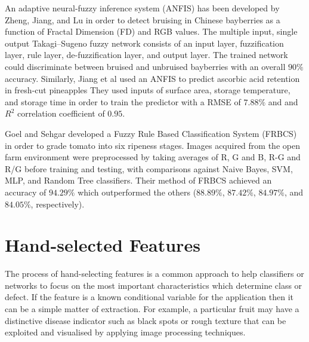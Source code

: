 \documentclass[fleqn,twoside,12pt]{report}
\begin{document}
An adaptive neural-fuzzy inference system (ANFIS) has been developed by Zheng, Jiang, and Lu \cite{zheng} in order to detect bruising in Chinese bayberries as a function of Fractal Dimension (FD) and RGB values. The multiple input, single output Takagi–Sugeno fuzzy network consists of an input layer, fuzzification layer, rule layer, de-fuzzification layer, and output layer. The trained network could discriminate between bruised and unbruised bayberries with an overall $90\%$ accuracy. Similarly, Jiang et al \cite{jiang} used an ANFIS to predict ascorbic acid retention in fresh-cut pineapples They used inputs of surface area, storage temperature, and storage time in order to train the predictor with a RMSE of $7.88\%$ and and $R^2$ correlation coefficient of $0.95$.

Goel and Sehgar \cite{goel} developed a Fuzzy Rule Based Classification System (FRBCS) in order to grade tomato into six ripeness stages. Images acquired from the open farm environment were preprocessed by taking averages of R, G and B, R-G and R/G before training and testing, with comparisons against Naive Bayes, SVM, MLP, and Random Tree classifiers. Their method of FRBCS achieved an accuracy of $94.29\%$ which outperformed the others ($88.89\%$, $87.42\%$, $84.97\%$, and $84.05\%$, respectively).  




\section{Hand-selected Features}

The process of hand-selecting features is a common approach to help classifiers or networks to focus on the most important characteristics which determine class or defect. If the feature is a known conditional variable for the application then it can be a simple matter of extraction. For example, a particular fruit may have a distinctive disease indicator such as black spots or rough texture that can be exploited and visualised by applying image processing techniques. 
\end{document}
